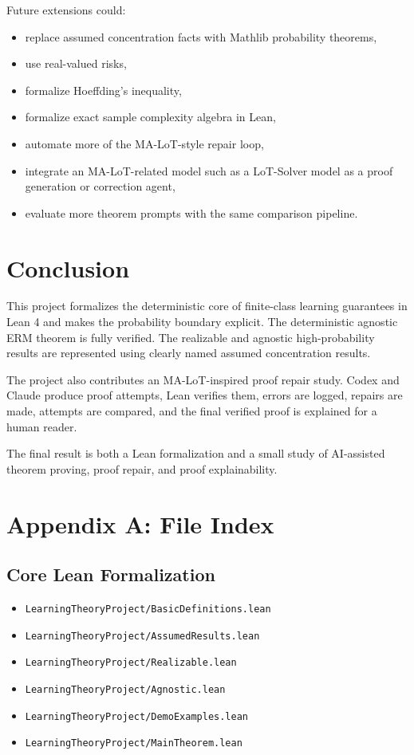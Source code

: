 \documentclass[11pt]{article}
\theoremstyle{definition}
\begin{document}
Future extensions could:
\begin{itemize}[leftmargin=*]
  \item replace assumed concentration facts with Mathlib probability theorems,
  \item use real-valued risks,
  \item formalize Hoeffding's inequality,
  \item formalize exact sample complexity algebra in Lean,
  \item automate more of the MA-LoT-style repair loop,
  \item integrate an MA-LoT-related model such as a LoT-Solver model as a proof
  generation or correction agent,
  \item evaluate more theorem prompts with the same comparison pipeline.
\end{itemize}

\section{Conclusion}

This project formalizes the deterministic core of finite-class learning
guarantees in Lean 4 and makes the probability boundary explicit. The
deterministic agnostic ERM theorem is fully verified. The realizable and
agnostic high-probability results are represented using clearly named assumed
concentration results.

The project also contributes an MA-LoT-inspired proof repair study. Codex and
Claude produce proof attempts, Lean verifies them, errors are logged, repairs
are made, attempts are compared, and the final verified proof is explained for a
human reader.

The final result is both a Lean formalization and a small study of
AI-assisted theorem proving, proof repair, and proof explainability.

\appendix

\section{Appendix A: File Index}

\subsection{Core Lean Formalization}

\begin{itemize}[leftmargin=*]
  \item \texttt{LearningTheoryProject/BasicDefinitions.lean}
  \item \texttt{LearningTheoryProject/AssumedResults.lean}
  \item \texttt{LearningTheoryProject/Realizable.lean}
  \item \texttt{LearningTheoryProject/Agnostic.lean}
  \item \texttt{LearningTheoryProject/DemoExamples.lean}
  \item \texttt{LearningTheoryProject/MainTheorem.lean}
\end{itemize}
\end{document}
